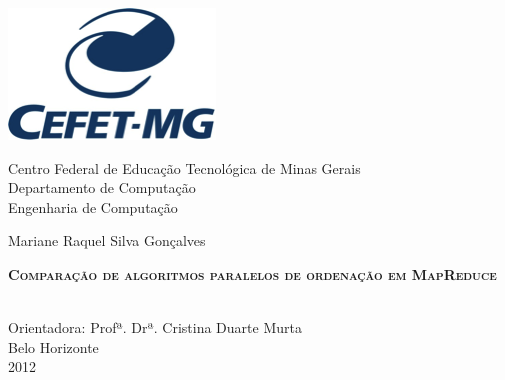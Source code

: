 \begin{titlepage}
\begin{minipage}{0.2\textwidth}
\begin{flushleft} 
\includegraphics[scale=0.7]{figuras/logo.png} 
\end{flushleft}
\end{minipage}
\hfill
\begin{minipage}{0.7\textwidth}
\begin{flushleft}
\begin{center}
Centro Federal de Educação Tecnológica de Minas Gerais \\
Departamento de Computação \\
Engenharia de Computação
\end{center}
\end{flushleft}
\end{minipage}

\begin{center}

\vspace{1.5cm}
Mariane Raquel Silva Gonçalves

\vspace{5cm}
\begin{Large} \textbf{ \textsc{Comparação de algoritmos paralelos de ordenação em MapReduce}}  \end{Large} \\

\vfill
Orientadora: Profª. Drª. Cristina Duarte Murta \\[1cm]

Belo Horizonte \\ 2012 \\
 
\end{center}
\end{titlepage}